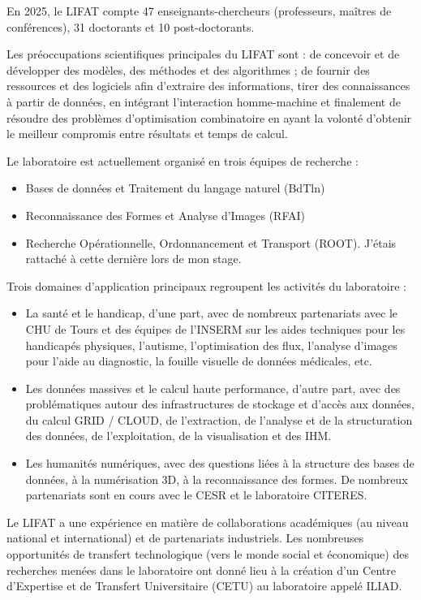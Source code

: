 \documentclass[a4paper,12pt,twoside,french]{article}
\begin{document}
En 2025, le LIFAT \cite{lifat} compte 47 enseignants-chercheurs (professeurs, maîtres de conférences), 31 doctorants et 10 post-doctorants.

Les préoccupations scientifiques principales du LIFAT sont : de concevoir et de développer des modèles, des méthodes et des algorithmes ; de fournir des ressources et des logiciels afin d'extraire des informations, tirer des connaissances à partir de données, en intégrant l'interaction homme-machine et finalement de résoudre des problèmes d'optimisation combinatoire en ayant la volonté d'obtenir le meilleur compromis entre résultats et temps de calcul.

Le laboratoire est actuellement organisé en trois équipes de recherche :
\begin{itemize}
    \item Bases de données et Traitement du langage naturel (BdTln)
    \item Reconnaissance des Formes et Analyse d'Images (RFAI)
    \item Recherche Opérationnelle, Ordonnancement et Transport (ROOT). J'étais rattaché à cette dernière lors de mon stage.
\end{itemize}

Trois domaines d'application principaux regroupent les activités du laboratoire :

\begin{itemize}
    \item La santé et le handicap, d'une part, avec de nombreux partenariats avec le CHU de Tours et des équipes de l'INSERM sur les aides techniques pour les handicapés physiques, l'autisme, l'optimisation des flux, l'analyse d'images pour l'aide au diagnostic, la fouille visuelle de données médicales, etc.
    \item Les données massives et le calcul haute performance, d'autre part, avec des problématiques autour des infrastructures de stockage et d'accès aux données, du calcul GRID / CLOUD, de l'extraction, de l'analyse et de la structuration des données, de l'exploitation, de la visualisation et des IHM.
    \item Les humanités numériques, avec des questions liées à la structure des bases de données, à la numérisation 3D, à la reconnaissance des formes. De nombreux partenariats sont en cours avec le CESR et le laboratoire CITERES.
\end{itemize}

Le LIFAT a une expérience en matière de collaborations académiques (au niveau national et international) et de partenariats industriels. Les nombreuses opportunités de transfert technologique (vers le monde social et économique) des recherches menées dans le laboratoire ont donné lieu à la création d'un Centre d’Expertise et de Transfert Universitaire (CETU) au laboratoire appelé ILIAD.
\end{document}
